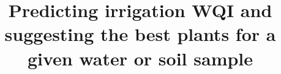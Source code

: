 %
%
%
%
%

%
\RequirePackage{fix-cm}
%
\documentclass[smallextended]{svjour3}       %
%
\smartqed  %
%
\usepackage{graphicx}
\usepackage{amsmath}
\usepackage{hyperref}
\usepackage{subcaption}
\usepackage{amssymb}
\usepackage{latexsym}
\usepackage{mathrsfs}
\usepackage{algorithm}
\usepackage{algorithmic}
\usepackage{tabularx}
\usepackage[table,xcdraw]{xcolor}
%
%
%
%
%


\title{ Predicting irrigation WQI and suggesting the best plants for a given water or soil sample%
}


